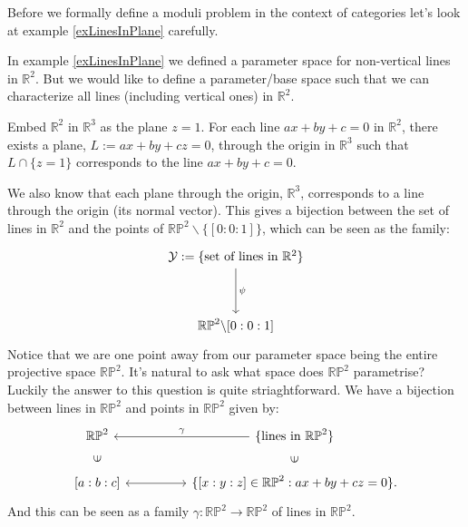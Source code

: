 Before we formally define a moduli problem in the context of categories let's look at example \ref{exLinesInPlane} carefully.
\begin{example}
    \label{compExLinesInplane}
    In example \ref{exLinesInPlane} we defined a parameter space for non-vertical lines in $\mathbb{R}^{2}$. 
    But we would like to define a parameter/base space such that we can characterize all lines (including vertical ones) in $\mathbb{R}^{2}$.
    \par Embed $\mathbb{R}^{2}$ in $\mathbb{R}^{3}$ as the plane $z = 1$.
    For each line $ax + by + c = 0 $ in $\mathbb{R}^{2}$, there exists a plane, $L := ax + by + cz = 0$,  through the origin in $\mathbb{R}^{3}$ such that $L \cap \{z=1\}$ corresponds to the line $ax + by + c = 0 $.
    \par We also know that each plane through the origin, $\mathbb{R}^{3}$, corresponds to a line through the origin (its normal vector). 
    This gives a bijection between the set of lines in $\mathbb{R}^{2}$ and the points of $\mathbb{RP}^{2}\backslash \{ [0:0:1]\}$, which can be seen as the family:
    \[
        \begin{tikzcd}
            \mathcal{Y} := \{\text{set of lines in } \mathbb{R}^{2}\}\\
            \\
            \mathbb{RP}^{2}\backslash {[0:0:1]}
            \arrow["\psi", from = 1-1, to = 3-1]
        \end{tikzcd}
    \]
    Notice that we are one point away from our parameter space being the entire projective space $\mathbb{RP}^{2}$.
    It's natural to ask what space does $\mathbb{RP}^{2}$ parametrise?
    Luckily the answer to this question is quite striaghtforward.
    We have a bijection between lines in $\mathbb{RP}^{2}$ and points in $\mathbb{RP}^{2}$ given by:
    \[
        \begin{tikzcd}
            {\mathbb{RP}^{2}} & & {\{\text{lines in }\mathbb{RP}^{2}\}} \\
            {[a:b:c]} \arrow[u, phantom, sloped, "\in"]& & {\{[x:y:z] \in \mathbb{RP}^{2}: ax + by + cz = 0 \}}\arrow[u, phantom, sloped, "\in"].
            \arrow["\gamma", leftarrow, from = 1-1, to = 1-3]
            \arrow[ leftrightarrow, from = 2-1, to = 2-3]
        \end{tikzcd}
    \]
    And this can be seen as a family $\gamma : \mathbb{RP}^{2}\to \mathbb{RP}^{2}$ of lines in $\mathbb{RP}^{2}$.

\end{example}

